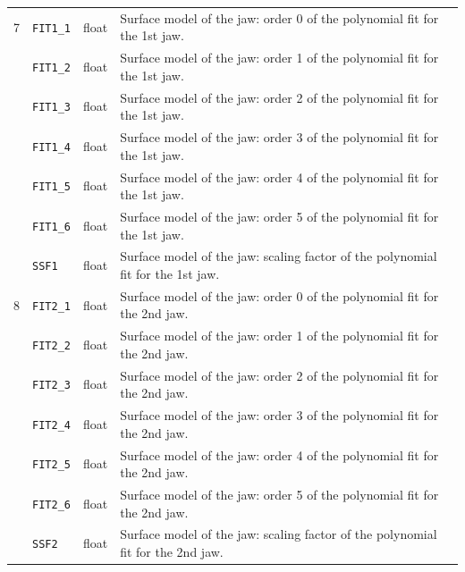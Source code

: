 \begin{center}
\begin{longtable}{| p{0.5cm} | p{2.4cm} | p{1.2cm} | >{\raggedright\arraybackslash}p{11.4cm}|}
    7   & \texttt{FIT1\_1}       & float   & Surface model of the jaw: order 0 of the polynomial fit for the 1st jaw. \\
        \cline{2-4}
        & \texttt{FIT1\_2}       & float   & Surface model of the jaw: order 1 of the polynomial fit for the 1st jaw. \\
        \cline{2-4}
        & \texttt{FIT1\_3}       & float   & Surface model of the jaw: order 2 of the polynomial fit for the 1st jaw. \\
        \cline{2-4}
        & \texttt{FIT1\_4}       & float   & Surface model of the jaw: order 3 of the polynomial fit for the 1st jaw. \\
        \cline{2-4}
        & \texttt{FIT1\_5}       & float   & Surface model of the jaw: order 4 of the polynomial fit for the 1st jaw. \\
        \cline{2-4}
        & \texttt{FIT1\_6}       & float   & Surface model of the jaw: order 5 of the polynomial fit for the 1st jaw. \\
        \cline{2-4}
        & \texttt{SSF1}          & float   & Surface model of the jaw: scaling factor of the polynomial fit for the 1st jaw. \\
    \hline

    8   & \texttt{FIT2\_1}       & float   & Surface model of the jaw: order 0 of the polynomial fit for the 2nd jaw. \\
        \cline{2-4}
        & \texttt{FIT2\_2}       & float   & Surface model of the jaw: order 1 of the polynomial fit for the 2nd jaw. \\
        \cline{2-4}
        & \texttt{FIT2\_3}       & float   & Surface model of the jaw: order 2 of the polynomial fit for the 2nd jaw. \\
        \cline{2-4}
        & \texttt{FIT2\_4}       & float   & Surface model of the jaw: order 3 of the polynomial fit for the 2nd jaw. \\
        \cline{2-4}
        & \texttt{FIT2\_5}       & float   & Surface model of the jaw: order 4 of the polynomial fit for the 2nd jaw. \\
        \cline{2-4}
        & \texttt{FIT2\_6}       & float   & Surface model of the jaw: order 5 of the polynomial fit for the 2nd jaw. \\
        \cline{2-4}
        & \texttt{SSF2}          & float   & Surface model of the jaw: scaling factor of the polynomial fit for the 2nd jaw. \\
    \hline


\end{longtable}
\end{center}
